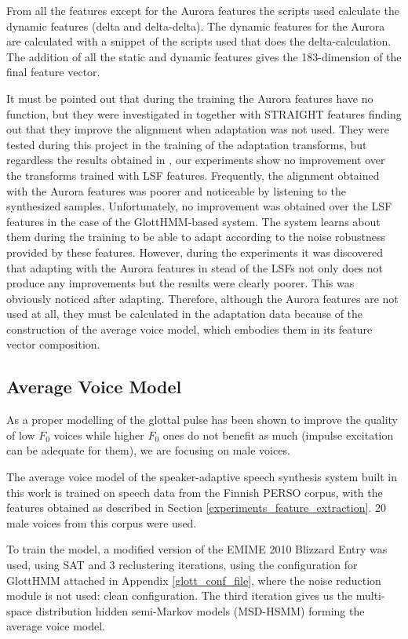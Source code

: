 From all the features except for the Aurora features the scripts used calculate the dynamic features (delta and delta-delta). 
%
The dynamic features for the Aurora are calculated with a snippet of the scripts used that does the delta-calculation.
%
The addition of all the static and dynamic features gives the 183-dimension of the final feature vector.

It must be pointed out that during the training the Aurora features have no function, but they were investigated in \cite{karhila_jstsp_14} together with STRAIGHT features finding out that they improve the alignment when adaptation was not used.
%
They were tested during this project in the training of the adaptation transforms, but regardless the results obtained in \cite{karhila_jstsp_14}, our experiments show no improvement over the transforms trained with LSF features.
%
Frequently, the alignment obtained with the Aurora features was poorer and noticeable by listening to the synthesized samples.
%
Unfortunately, no improvement was obtained over the LSF features in the case of the GlottHMM-based system.
%
The system learns about them during the training to be able to adapt according to the noise robustness provided by these features.
%
However, during the experiments it was discovered that adapting with the Aurora features in stead of the LSFs not only does not produce any improvements but the results were clearly poorer.
%
This was obviously noticed after adapting. 
%
Therefore, although the Aurora features are not used at all, they must be calculated in the adaptation data because of the construction of the average voice model, which embodies them in its feature vector composition.

\subsection{Average Voice Model}
\label{experiments_av_voice_model}
As a proper modelling of the glottal pulse has been shown to improve the quality of low $F_{0}$ voices while higher $F_{0}$ ones do not benefit as much (impulse excitation can be adequate for them), we are focusing on male voices.

The average voice model of the speaker-adaptive speech synthesis system built in this work is trained on speech data from the Finnish PERSO corpus, with the features obtained as described in Section \ref{experiments_feature_extraction}.
%
20 male voices from this corpus were used.

To train the model, a modified version of the EMIME 2010 Blizzard Entry \cite{emime_blizzard} was used, using SAT and 3 reclustering iterations, using the configuration for GlottHMM attached in Appendix \ref{glott_conf_file}, where the noise reduction module is not used: clean configuration. 
%
The third iteration gives us the multi-space distribution hidden semi-Markov models (MSD-HSMM) forming the average voice model.

